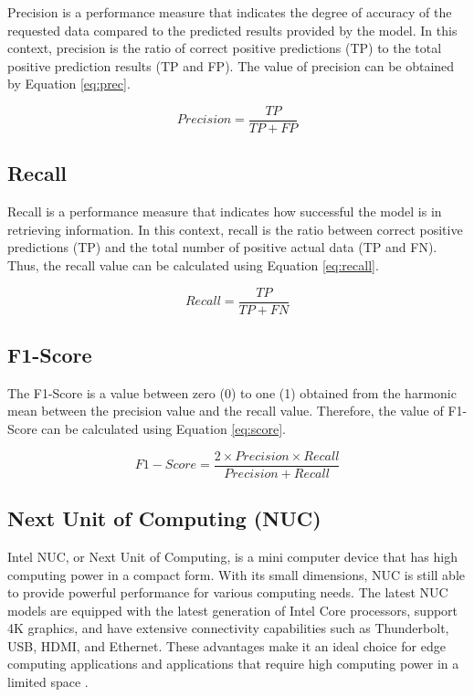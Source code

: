 Precision is a performance measure that indicates the degree of accuracy of the requested data compared to the predicted results provided by the model. In this context, precision is the ratio of correct positive predictions (TP) to the total positive prediction results (TP and FP). The value of precision can be obtained by Equation \ref{eq:prec}.

\begin{equation}
  \label{eq:prec}
  Precision=\frac{TP}{TP+FP}
\end{equation}

\subsection{Recall}
\label{subsec:recall_klasifikasi}

Recall is a performance measure that indicates how successful the model is in retrieving information. In this context, recall is the ratio between correct positive predictions (TP) and the total number of positive actual data (TP and FN). Thus, the recall value can be calculated using Equation \ref{eq:recall}.

\begin{equation}
  \label{eq:recall}
  Recall=\frac{TP}{TP+FN}
\end{equation}

\subsection{F1-Score}
\label{subsec:score_klasifikasi}

The F1-Score is a value between zero (0) to one (1) obtained from the harmonic mean between the precision value and the recall value. Therefore, the value of F1-Score can be calculated using Equation \ref{eq:score}.

\begin{equation}
  \label{eq:score}
  F{1}{-}Score=\frac{2 \times Precision \times Recall}{Precision+Recall}
\end{equation}

\subsection{Next Unit of Computing (NUC)}

Intel NUC, or Next Unit of Computing, is a mini computer device that has high computing power in a compact form. With its small dimensions, NUC is still able to provide powerful performance for various computing needs. The latest NUC models are equipped with the latest generation of Intel Core processors, support 4K graphics, and have extensive connectivity capabilities such as Thunderbolt, USB, HDMI, and Ethernet. These advantages make it an ideal choice for edge computing applications and applications that require high computing power in a limited space \cite{intel_nuc}.